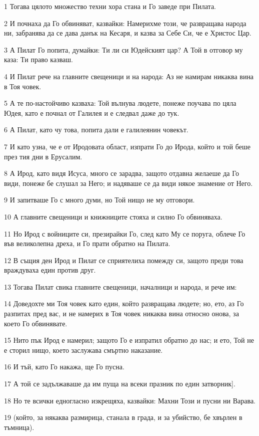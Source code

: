 \par 1 Тогава цялото множество техни хора стана и Го заведе при Пилата.
\par 2 И почнаха да Го обвиняват, казвайки: Намерихме този, че развращава народа ни, забранява да се дава данък на Кесаря, и казва за Себе Си, че е Христос Цар.
\par 3 А Пилат Го попита, думайки: Ти ли си Юдейският цар? А Той в отговор му каза: Ти право казваш.
\par 4 И Пилат рече на главните свещеници и на народа: Аз не намирам никаква вина в Тоя човек.
\par 5 А те по-настойчиво казваха: Той вълнува людете, понеже поучава по цяла Юдея, като е почнал от Галилея и е следвал даже до тук.
\par 6 А Пилат, като чу това, попита дали е галилеянин човекът.
\par 7 И като узна, че е от Иродовата област, изпрати Го до Ирода, който и той беше през тия дни в Ерусалим.
\par 8 А Ирод, като видя Исуса, много се зарадва, защото отдавна желаеше да Го види, понеже бе слушал за Него; и надяваше се да види някое знамение от Него.
\par 9 И запитваше Го с много думи, но Той нищо не му отговори.
\par 10 А главните свещеници и книжниците стояха и силно Го обвиняваха.
\par 11 Но Ирод с войниците си, презирайки Го, след като Му се поруга, облече Го във великолепна дреха, и Го прати обратно на Пилата.
\par 12 В същия ден Ирод и Пилат се сприятелиха помежду си, защото преди това враждуваха един против друг.
\par 13 Тогава Пилат свика главните свещеници, началници и народа, и рече им:
\par 14 Доведохте ми Тоя човек като един, който развращава людете; но, ето, аз Го разпитах пред вас, и не намерих в Тоя човек никаква вина относно онова, за което Го обвинявате.
\par 15 Нито пък Ирод е намерил; защото Го е изпратил обратно до нас; и ето, Той не е сторил нищо, което заслужава смъртно наказание.
\par 16 И тъй, като Го накажа, ще Го пусна.
\par 17 А той се задължаваше да им пуща на всеки празник по един затворник].
\par 18 Но те всички едногласно изкрещяха, казвайки: Махни Този и пусни ни Варава.
\par 19 (който, за някаква размирица, станала в града, и за убийство, бе хвърлен в тъмница).
